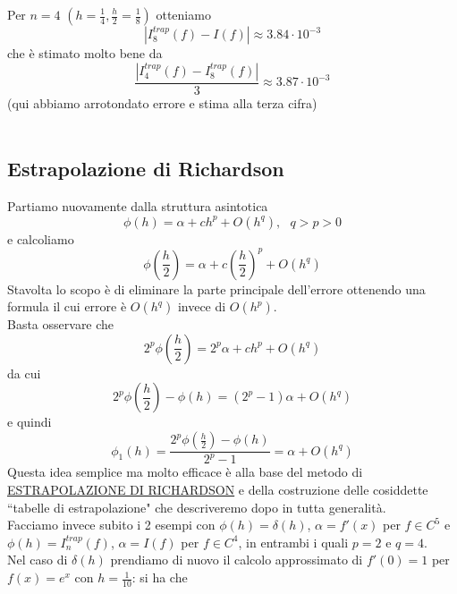 \documentclass[12pt,a4paper]{article}
\begin{document}
Per $n=4$ $(h=\frac{1}{4},\frac{h}{2}=\frac{1}{8})$ otteniamo
\begin{equation*}
    |I_8^{trap}(f)-I(f)|\approx3.84\cdot 10^{-3}
\end{equation*}
che è stimato molto bene da
\begin{equation*}
    \frac{|I_4^{trap}(f)-I_8^{trap}(f)|}{3}\approx3.87\cdot 10^{-3}
\end{equation*}
(qui abbiamo arrotondato errore e stima alla terza cifra)\\\\

\subsection{Estrapolazione di Richardson}
Partiamo nuovamente dalla struttura asintotica
\begin{equation*}
    \phi(h)=\alpha+ch^p+O(h^q),\  \  \ q>p>0
\end{equation*}
e calcoliamo 
\begin{equation*}
    \phi\left(\frac{h}{2}\right)=\alpha+c\left(\frac{h}{2}\right)^p+O(h^q)
\end{equation*}
Stavolta lo scopo è di eliminare la parte principale dell'errore
ottenendo una formula il cui errore è $O(h^q)$ invece di $O(h^p)$.\\Basta osservare che
\begin{equation*}
    2^p\phi\left(\frac{h}{2}\right)=2^p\alpha+ch^p+O(h^q)
\end{equation*}
da cui
\begin{equation*}
    2^p\phi\left(\frac{h}{2}\right)-\phi(h)=(2^p-1)\alpha+O(h^q)
\end{equation*}
e quindi
\begin{equation*}
    \phi_1(h)=\frac{2^p\phi\left(\frac{h}{2}\right)-\phi(h)}{2^p-1}=\alpha+O(h^q)
\end{equation*}
Questa idea semplice ma molto efficace è alla base del metodo di \uline{ESTRAPOLAZIONE DI RICHARDSON} e della costruzione delle cosiddette
``tabelle di estrapolazione" che descriveremo dopo in tutta generalità.\\Facciamo invece subito i 2 esempi con $\phi(h)=\delta(h)$, $\alpha=f'(x)$ per $f\in C^5$ e $\phi(h)=I_n^{trap}(f)$, $\alpha=I(f)$ per $f\in C^4$, in entrambi i quali $p=2$ e $q=4$.\\Nel caso di $\delta(h)$ prendiamo di nuovo il calcolo approssimato di $f'(0)=1$ per $f(x)=e^x$ con $h=\frac{1}{10}$: si ha che 
\end{document}
